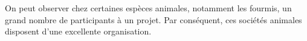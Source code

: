 


On peut observer chez certaines espèces animales, notamment les fourmis, un grand nombre de participants à un projet. Par conséquent, ces sociétés animales disposent d'une excellente organisation.
